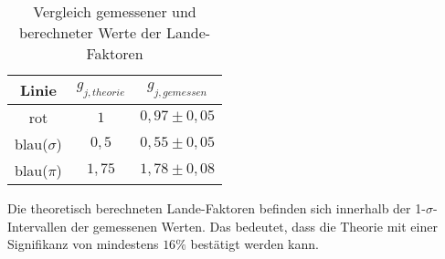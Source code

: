 \begin{table}
    \centering
    \caption{Vergleich gemessener und berechneter Werte der Lande-Faktoren}
    \label{tab:Endergebnisse}
    \begin{tabular}{ccc}
        \toprule
        Linie & $g_{j,theorie}$ & $g_{j,gemessen}$\\
        \midrule
        rot             & $1$       & $0,97\pm 0,05$\\
        blau($\sigma$)  & $0,5$     & $0,55\pm 0,05$\\
        blau($\pi$)     & $1,75$    & $1,78\pm 0,08$\\
        \bottomrule
    \end{tabular}
\end{table}
Die theoretisch berechneten Lande-Faktoren befinden sich innerhalb der 1-$\sigma$-Intervallen der gemessenen Werten.
Das bedeutet, dass die Theorie mit einer Signifikanz von mindestens $16\%$ bestätigt werden kann.